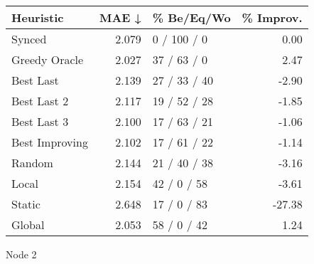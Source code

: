 \begin{tabular}{lrlr}
\toprule
\textbf{Heuristic} & \textbf{MAE ↓} & \textbf{\% Be/Eq/Wo} & \textbf{\% Improv.} \\
\midrule
            Synced &          2.079 &          0 / 100 / 0 &                0.00 \\
     Greedy Oracle &          2.027 &          37 / 63 / 0 &                2.47 \\
         Best Last &          2.139 &         27 / 33 / 40 &               -2.90 \\
       Best Last 2 &          2.117 &         19 / 52 / 28 &               -1.85 \\
       Best Last 3 &          2.100 &         17 / 63 / 21 &               -1.06 \\
    Best Improving &          2.102 &         17 / 61 / 22 &               -1.14 \\
            Random &          2.144 &         21 / 40 / 38 &               -3.16 \\
             Local &          2.154 &          42 / 0 / 58 &               -3.61 \\
            Static &          2.648 &          17 / 0 / 83 &              -27.38 \\
            Global &          2.053 &          58 / 0 / 42 &                1.24 \\
\bottomrule
\end{tabular}
\caption{Node 2}
\label{tab:hr_non_lr05_le1_bs4_2}
